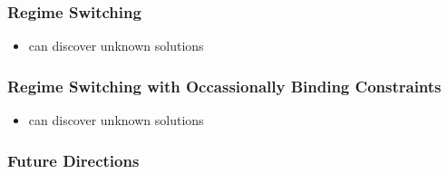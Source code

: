 \documentclass[tikz]{beamer}
\begin{document}
\begin{frame}
\frametitle{Regime Switching}
\begin{itemize}
\item can discover unknown solutions
\end{itemize}


\end{frame}

\begin{frame}
\frametitle{Regime Switching with Occassionally Binding Constraints}
\begin{itemize}
\item can discover unknown solutions
\end{itemize}

\end{frame}
\begin{frame}
\frametitle{Future Directions}
\end{frame}
\end{document}
